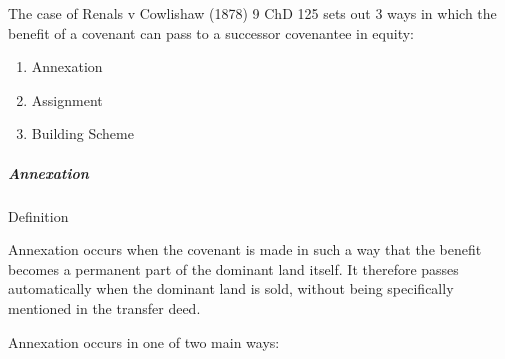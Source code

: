 \documentclass[
]{article}
\providecommand{\tightlist}{%
  \setlength{\itemsep}{0pt}\setlength{\parskip}{0pt}}
\newenvironment{env-615494ee-4c11-425d-a24a-676608cc22a4}
{
    \savenotes\tcolorbox[blanker,breakable,left=5pt,borderline west={2pt}{-4pt}{gold}]
}
{
    \endtcolorbox\spewnotes
}
\begin{document}
The case of Renals v Cowlishaw (1878) 9 ChD 125 sets out 3 ways in which
the benefit of a covenant can pass to a successor covenantee in equity:

\begin{enumerate}
\tightlist
\item
  Annexation
\item
  Assignment
\item
  Building Scheme
\end{enumerate}

\hypertarget{annexation}{%
\subparagraph{Annexation}\label{annexation}}

\begin{env-615494ee-4c11-425d-a24a-676608cc22a4}

Definition

Annexation occurs when the covenant is made in such a way that the
benefit becomes a permanent part of the dominant land itself. It
therefore passes automatically when the dominant land is sold, without
being specifically mentioned in the transfer deed.

\end{env-615494ee-4c11-425d-a24a-676608cc22a4}

Annexation occurs in one of two main ways:
\end{document}

